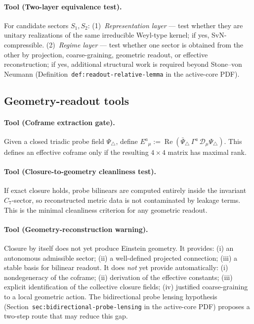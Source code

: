 \paragraph{Tool (Two-layer equivalence test).}
For candidate sectors $S_1, S_2$: (1)~\emph{Representation layer} ---
test whether they are unitary realizations of the same irreducible
Weyl-type kernel; if yes, SvN-compressible. (2)~\emph{Regime layer} ---
test whether one sector is obtained from the other by projection,
coarse-graining, geometric readout, or effective reconstruction; if yes,
additional structural work is required beyond Stone--von Neumann
(Definition~\texttt{def:readout-relative-lemma} in the active-core PDF).

\subsection*{Geometry-readout tools}

\paragraph{Tool (Coframe extraction gate).}
Given a closed triadic probe field $\Psi_\triangle$, define
$E^a{}_\mu := \operatorname{Re}(\bar\Psi_\triangle\,\Gamma^a\,
\mathcal{D}_\mu\Psi_\triangle)$.
This defines an effective coframe only if the resulting $4\times 4$
matrix has maximal rank.

\paragraph{Tool (Closure-to-geometry cleanliness test).}
If exact closure holds, probe bilinears are computed entirely inside
the invariant $C_7$-sector, so reconstructed metric data is not
contaminated by leakage terms. This is the minimal cleanliness
criterion for any geometric readout.

\paragraph{Tool (Geometry-reconstruction warning).}
Closure by itself does not yet produce Einstein geometry. It provides:
(i) an autonomous admissible sector; (ii) a well-defined projected
connection; (iii) a stable basis for bilinear readout. It does
\emph{not} yet provide automatically: (i) nondegeneracy of the
coframe; (ii) derivation of the effective constants; (iii) explicit
identification of the collective closure fields; (iv) justified
coarse-graining to a local geometric action. The bidirectional probe
lensing hypothesis (Section~\texttt{sec:bidirectional-probe-lensing} in the active-core PDF)
proposes a two-step route that may reduce this gap.

